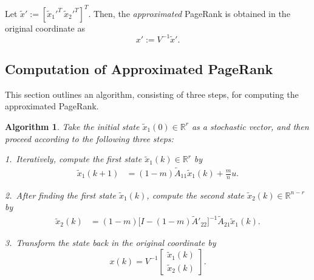 \documentclass[11pt,draftcls,onecolumn]{IEEEtran}
\newtheorem{algorithm}[theorem]{Algorithm}
\newcommand{\field}[1]{{\mathbb{#1}}}
\newcommand{\R}{\field{R}}
\begin{document}
Let $\widetilde{x}':=[\widetilde{x}_1'^T~\widetilde{x}_2'^T]^T$.
Then, the \textit{approximated} PageRank is obtained in the original coordinate as
\begin{equation}
   x':= V^{-1}\widetilde{x}'.
 \label{eqn:xdash0} 
\end{equation}

\subsection*{Computation of Approximated PageRank}

This section outlines an algorithm, consisting of three steps, for computing the approximated PageRank.

\begin{algorithm}
\label{alg:1}\rm 
Take the initial state $\widetilde{x}_1(0)\in\R^r$ as a stochastic vector, and 
then proceed according to the following three steps:

1.~Iteratively, compute the first state $\widetilde{x}_1(k)\in\R^r$ by
\begin{align}
 \widetilde{x}_1(k+1)
  &= (1-m)\widetilde{A}_{11} \widetilde{x}_1(k)
       + \frac{m}{n}u.
\label{eqn:updateVx_red1}
\end{align}

2.~After finding the first state $\widetilde{x}_1(k)$,
compute the second state $\widetilde{x}_2(k)\in\R^{n-r}$ by
\begin{align}
 \widetilde{x}_2(k)
  &= (1-m)\big[
            I - (1-m)\widetilde{A}'_{22}
          \big]^{-1}
           \widetilde{A}_{21} \widetilde{x}_1(k).
\label{eqn:updateVx_red2}
\end{align}

3.~Transform the state back in 
the original coordinate by
\begin{equation}
 x(k) = V^{-1} \begin{bmatrix}
                   \widetilde{x}_1(k)\\
                   \widetilde{x}_2(k)
               \end{bmatrix}.
 \label{eqn:updateVx_red3}
\end{equation}
\end{algorithm}
\end{document}
